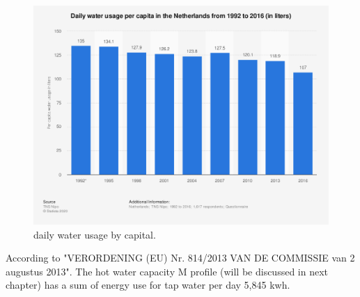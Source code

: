\documentclass[a4paper,10pt]{article}
\begin{document}
\begin{figure}[H]
\centering
\includegraphics[width=1\columnwidth]{pictures/daily water usage.png}
\caption[Short title]{daily water usage by capital.}
\label{fig:ff4}\end{figure}



According to "VERORDENING (EU) Nr. 814/2013 VAN DE COMMISSIE van 2 augustus 2013". The hot water capacity M profile (will be discussed in next chapter) has a sum of energy use for tap water per day 5,845 kwh.
\end{document}
